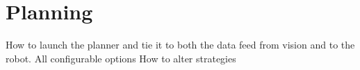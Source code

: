\section{Planning}
How to launch the planner and tie it to both the data feed from vision and to the robot.
All configurable options 
How to alter strategies